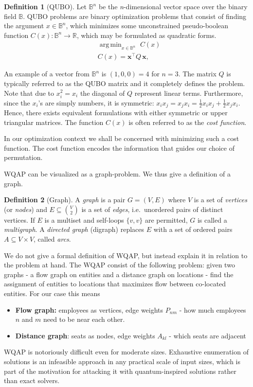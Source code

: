 \documentclass[10pt]{article}
\DeclareMathOperator*{\argmin}{arg\,min}
\theoremstyle{definition}
\newtheorem{definition}{Definition}[section]
\theoremstyle{plain}
\theoremstyle{remark}
\begin{document}
	\begin{definition}[QUBO]
		Let $\mathbb{B}^n$ be the \textit{n}-dimensional vector space over the binary field $\mathbb {B}$. QUBO problems are binary optimization problems that consist of finding the argument $x\in\mathbb{B}^n$, which minimizes some unconstrained pseudo-boolean function $C(x): \mathbb{B}^n\rightarrow\mathbb{R}$,
		which may be formulated as quadratic forms. 
		\begin{align}
			& \argmin_{x\in\mathbb{B}^n}\,\, C(x) \\
			& C(x) = \mathbf{x}^\top Q\, \mathbf{x}, 
		\end{align}
	\end{definition}
	An example of a vector from $\mathbb{B}^n$ is $(1, 0, 0) = 4$ for $n=3$. The matrix $Q$ is typically referred to as the QUBO matrix and it completely defines the problem. Note that due to $x_i^2 = x_i$ the diagonal of $Q$ represent linear terms. Furthermore, since the $x_i$'s are simply numbers, it is symmetric: $x_ix_j = x_jx_i = \frac12x_ix_j + \frac12x_jx_i$. Hence, there exists equivalent formulations with either symmetric or upper triangular matrices. The function $C(x)$ is often referred to as the \emph{cost function}. 
	
	In our optimization context we shall be concerned with minimizing such a cost function. The cost function encodes the information that guides our choice of permutation. 
	
	WQAP can be visualized as a graph-problem. We thus give a definition of a graph.	
	
	\begin{definition}[Graph]
		A \emph{graph} is a pair $G = (V, E)$ where $V$ is a set of \emph{vertices} (or \emph{nodes})
		and $E \subseteq \binom{V}{2}$ is a set of \emph{edges}, i.e.\ unordered pairs of distinct
		vertices. If $E$ is a multiset and self-loops $\{v,v\}$ are permitted, $G$ is called a
		\emph{multigraph}. A \emph{directed graph} (digraph) replaces $E$ with a set of ordered pairs
		$A \subseteq V \times V$, called \emph{arcs}.
	\end{definition}
	
	We do not give a formal definition of WQAP, but instead explain it in relation to the problem at hand. The WQAP consist of the following problem: given two graphs - a flow graph on entities and a distance graph on locations - find the assignment of entities to locations that maximizes flow between co-located entities. For our case this means
	\begin{itemize}
		\item \textbf{Flow graph:} employees as vertices, edge weights $P_{nm}$ - how much employees $n$ and $m$ need to be near each other.
		\item \textbf{Distance graph}: seats as nodes, edge weights $A_{kl}$ - which seats are adjacent
	\end{itemize}
	WQAP is notoriously difficult even for moderate sizes. Exhaustive enumeration of solutions is an infeasible approach in any practical scale of input sizes, which is part of the motivation for attacking it with quantum-inspired solutions rather than exact solvers.
	
\end{document}
